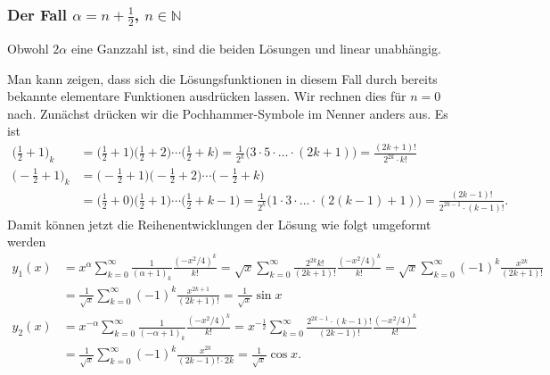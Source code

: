 %
%
\subsubsection{Der Fall $\alpha=n+\frac12$, $n\in\mathbb{N}$}
Obwohl $2\alpha$ eine Ganzzahl ist, sind die beiden Lösungen
\label{buch:differentialgleichunge:bessel:erste}
und
\label{buch:differentialgleichunge:bessel:zweite}
linear unabhängig.

Man kann zeigen, dass sich die Lösungsfunktionen in diesem Fall
durch bereits bekannte elementare Funktionen ausdrücken lassen.
Wir rechnen dies für $n=0$ nach.
Zunächst drücken wir die Pochhammer-Symbole im Nenner anders aus.
Es ist
\begin{align*}
\biggl(\frac12 + 1\biggr)_k
&=
\biggl(\frac12 + 1\biggr)
\biggl(\frac12 + 2\biggr)
\cdots
\biggl(\frac12 + k\biggr)
=
\frac{1}{2^k}\bigl(3\cdot 5\cdot\ldots\cdot (2k+1)\bigr)
=
\frac{(2k+1)!}{2^{2k}\cdot k!}
\\
\biggl(-\frac12 + 1\biggr)_k
&=
\biggl(-\frac12 + 1\biggr)
\biggl(-\frac12 + 2\biggr)
\cdots
\biggl(-\frac12 + k\biggr)
\\
&=
\biggl(\frac12 + 0\biggr)
\biggl(\frac12 + 1\biggr)
\cdots
\biggl(\frac12 + k-1\biggr)
=
\frac{1}{2^k}\bigl(1\cdot 3 \cdot\ldots\cdot (2(k-1)+1)\bigr)
=
\frac{(2k-1)!}{2^{2k-1}\cdot (k-1)!}.
\end{align*}
Damit können jetzt die Reihenentwicklungen der Lösung wie folgt
umgeformt werden
\begin{align*}
y_1(x)
&=
x^\alpha
\sum_{k=0}^\infty
\frac{1}{(\alpha+1)_k}
\frac{(-x^2/4)^k}{k!}
=
\sqrt{x}
\sum_{k=0}^\infty
\frac{2^{2k}k!}{(2k+1)!}
\frac{(-x^2/4)^k}{k!}
=
\sqrt{x}
\sum_{k=0}^\infty
(-1)^k
\frac{x^{2k}}{(2k+1)!}
\\
&=
\frac{1}{\sqrt{x}}
\sum_{k=0}^\infty
(-1)^k
\frac{x^{2k+1}}{(2k+1)!}
=
\frac{1}{\sqrt{x}} \sin x
\\
y_2(x)
&=
x^{-\alpha}
\sum_{k=0}^\infty
\frac{1}{(-\alpha+1)_k}
\frac{(-x^2/4)^k}{k!}
=
x^{-\frac12}
\sum_{k=0}^\infty
\frac{2^{2k-1}\cdot (k-1)!}{(2k-1)!}
\frac{(-x^2/4)^k}{k!}
\\
&=
\frac{1}{\sqrt{x}}
\sum_{k=0}^\infty
(-1)^k
\frac{x^{2k}}{(2k-1)!\cdot 2k}
=
\frac{1}{\sqrt{x}} \cos x.
\end{align*}

